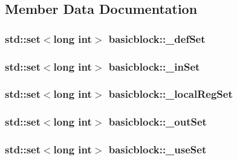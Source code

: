 \subsection{Member Data Documentation}
\hypertarget{classbasicblock_a10324f2866495c2fbd24b7c8e05af7be}{
\subsubsection[{\_\-defSet}]{\setlength{\rightskip}{0pt plus 5cm}std::set$<$long int$>$ {\bf basicblock::\_\-defSet}}}
\label{classbasicblock_a10324f2866495c2fbd24b7c8e05af7be}
\hypertarget{classbasicblock_ac93c3bff2754390b7d24d44a652f1dfa}{
\subsubsection[{\_\-inSet}]{\setlength{\rightskip}{0pt plus 5cm}std::set$<$long int$>$ {\bf basicblock::\_\-inSet}}}
\label{classbasicblock_ac93c3bff2754390b7d24d44a652f1dfa}
\hypertarget{classbasicblock_aad1405bed7911414e0ed1332419e48b8}{
\subsubsection[{\_\-localRegSet}]{\setlength{\rightskip}{0pt plus 5cm}std::set$<$long int$>$ {\bf basicblock::\_\-localRegSet}}}
\label{classbasicblock_aad1405bed7911414e0ed1332419e48b8}
\hypertarget{classbasicblock_ac9145f343d3538730f25fe0469420ba8}{
\subsubsection[{\_\-outSet}]{\setlength{\rightskip}{0pt plus 5cm}std::set$<$long int$>$ {\bf basicblock::\_\-outSet}}}
\label{classbasicblock_ac9145f343d3538730f25fe0469420ba8}
\hypertarget{classbasicblock_aaff8e15dfe5fa007a97965f5d5c6e8da}{
\subsubsection[{\_\-useSet}]{\setlength{\rightskip}{0pt plus 5cm}std::set$<$long int$>$ {\bf basicblock::\_\-useSet}}}
\label{classbasicblock_aaff8e15dfe5fa007a97965f5d5c6e8da}


